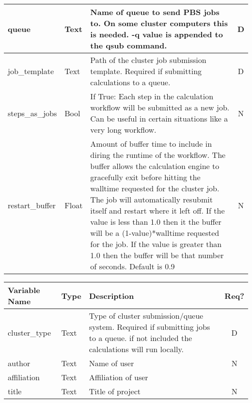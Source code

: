 \documentclass[11pt]{article}
\begin{document}
\begin{center}
\begin{tabular}{|p{3cm}|l|p{9cm}|c|}




queue             & Text & Name of queue to send PBS jobs to. On some cluster computers this is needed. -q value is appended to the qsub command.& D \\
\hline
job\_template     & Text &Path of the cluster job submission template. Required if submitting calculations to a queue.& D\\
\hline
steps\_as\_jobs   & Bool & If True: Each step in the calculation workflow will be submitted as a new job. Can be useful in certain situations like a very long workflow.& N \\
\hline
restart\_buffer   & Float & Amount of buffer time to include in diring the runtime of the workflow. The buffer allows the calculation engine to gracefully exit before hitting the walltime requested for the cluster job. The job will automatically resubmit itself and restart where it left off. If the value is less than 1.0 then it the buffer will be a (1-value)*walltime requested for the job. If the value is greater than 1.0 then the buffer will be that number of seconds. Default is 0.9& N\\
\hline

\end{tabular}
\newpage
\begin{tabular}{|p{3cm}|l|p{9cm}|c|}
\hline
\textbf{Variable Name} & \textbf{Type} & \textbf{Description} & \textbf{Req?}\\
\hline
cluster\_type     & Text& Type of cluster submission/queue system. Required if submitting jobs to a queue. if not included the calculations will run locally.& D\\
\hline
author         & Text & Name of user & N \\
\hline
affiliation    & Text & Affiliation of user& \\
\hline
title          & Text & Title of project& N\\
\hline


\end{tabular}
\end{center}
\end{document}
